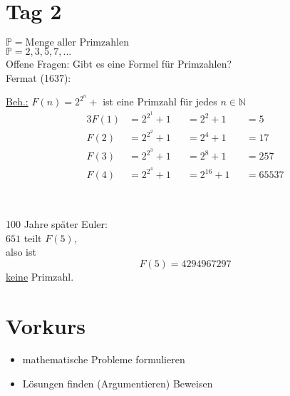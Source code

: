 \documentclass[a4paper]{article}
\newcommand{\conjecture}	{\underline{Beh.:}}
\begin{document}
\section{Tag 2}
$\mathbb{P} = \text{Menge aller Primzahlen}$\\
$\mathbb{P} = {2, 3, 5, 7, ...}$\\
Offene Fragen: Gibt es eine Formel für Primzahlen?\\
Fermat (1637):\par
\begin{minipage}{0.5\textwidth}
	\setlength{\parindent}{1em}
	\conjecture{} $F(n) = 2^{2^n} + $ ist eine Primzahl für jedes $n \in \mathbb{N}$
	\begin{alignat*}{3}
		F(1) &= 2^{2^1} + 1 &&= 2^2 + 1 &&= 5\\
		F(2) &= 2^{2^2} + 1 &&= 2^4 + 1 &&= 17\\
		F(3) &= 2^{2^3} + 1 &&= 2^8 + 1 &&= 257\\
		F(4) &= 2^{2^4} + 1 &&= 2^16 + 1 &&= 65537
	\end{alignat*}
\end{minipage}
\begin{minipage}{0.05\textwidth}
	~
\end{minipage}
\begin{minipage}{0.4\textwidth}
	\setlength{\parindent}{1em}
	100 Jahre später Euler:\\
	$651$ teilt $F(5)$,\\
	also ist
	\[F(5) = 4294967297\]
	\underline{keine} Primzahl.
\end{minipage}

\section{Vorkurs}
\begin{itemize}
	\item mathematische Probleme formulieren
	\item Lösungen finden (Argumentieren) Beweisen
\end{itemize}
\end{document}
